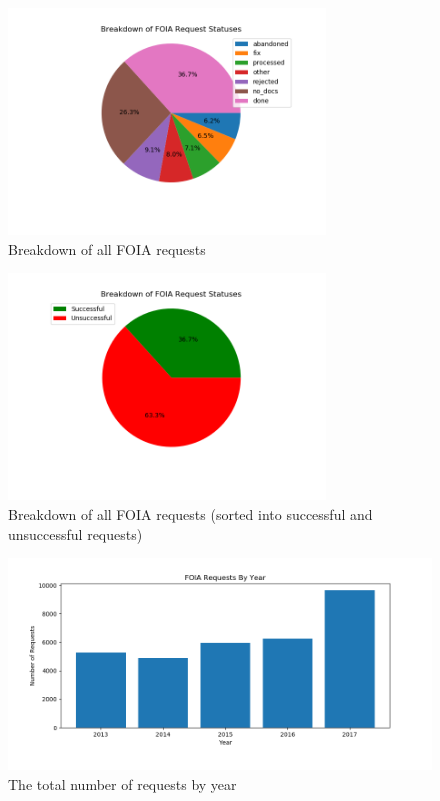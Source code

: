 \documentclass{article}
\begin{document}
\begin{figure}[H]
	\centering
	\includegraphics[width=0.75\textwidth]{statuses}
	\caption{Breakdown of all FOIA requests}
	\label{fig:statuses}
\end{figure}

\begin{figure}[H]
	\centering
	\includegraphics[width=0.75\textwidth]{statuses_simple}
	\caption{Breakdown of all FOIA requests (sorted into successful and unsuccessful requests)}
	\label{fig:statuses_simple}
\end{figure}

\begin{figure}[H]
	\centering
	\includegraphics[width=1\textwidth]{yearly_total}
	\caption{The total number of requests by year}
	\label{fig:yearly_total}
\end{figure}
\end{document}
